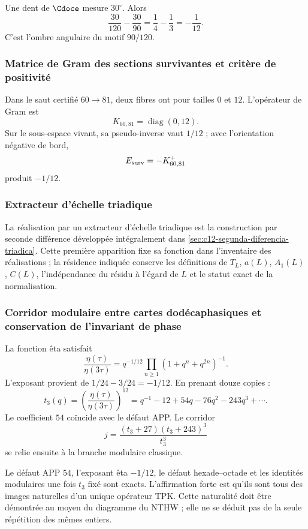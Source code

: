 Une dent de \(\Cdoce\) mesure \(30^\circ\). Alors
\[
\frac{30}{120}-\frac{30}{90}
=\frac14-\frac13
=-\frac1{12}.
\]
C’est l’ombre angulaire du motif \(90/120\).

\subsubsection{Matrice de Gram des sections survivantes et critère de positivité}

Dans le saut certifié \(60\to81\), deux fibres ont pour tailles \(0\) et
\(12\). L’opérateur de Gram est
\[
K_{60,81}=\operatorname{diag}(0,12).
\]
Sur le sous-espace vivant, sa pseudo-inverse vaut \(1/12\) ; avec l’orientation
négative de bord,
\[
E_{\rm surv}=-K_{60,81}^{+}
\]
produit \(-1/12\).

\subsubsection{Extracteur d'échelle triadique}

La réalisation par un extracteur d’échelle triadique est la construction par
seconde différence développée intégralement dans
\cref{sec:c12-segunda-diferencia-triadica}. Cette première apparition fixe sa
fonction dans l’inventaire des réalisations ; la résidence indiquée conserve
les définitions de \(T_L\), \(a(L)\), \(A_1(L)\), \(C(L)\), l’indépendance
du résidu à l’égard de \(L\) et le statut exact de la normalisation.

\subsubsection{Corridor modulaire entre cartes dodécaphasiques et conservation de l'invariant de phase}

La fonction êta satisfait
\[
\frac{\eta(\tau)}{\eta(3\tau)}
=q^{-1/12}\prod_{n\ge1}(1+q^n+q^{2n})^{-1}.
\]
L’exposant provient de \(1/24-3/24=-1/12\). En prenant douze copies :
\[
t_3(q)=\left(\frac{\eta(\tau)}{\eta(3\tau)}\right)^{12}
=q^{-1}-12+54q-76q^2-243q^3+\cdots.
\]
Le coefficient \(54\) coïncide avec le défaut APP. Le corridor
\[
j=\frac{(t_3+27)(t_3+243)^3}{t_3^3}
\]
se relie ensuite à la branche modulaire classique.

\begin{exactbox}[title={Ce qui a été démontré dans le corridor}]
Le défaut APP \(54\), l'exposant êta \(-1/12\), le défaut
hexade--octade et les identités modulaires une fois \(t_3\) fixé sont exacts. L'affirmation
forte est qu'ils sont tous des images naturelles d'un unique opérateur
TPK. Cette naturalité doit être démontrée au moyen du diagramme du NTHW ; elle ne se
déduit pas de la seule répétition des mêmes entiers.
\end{exactbox}

